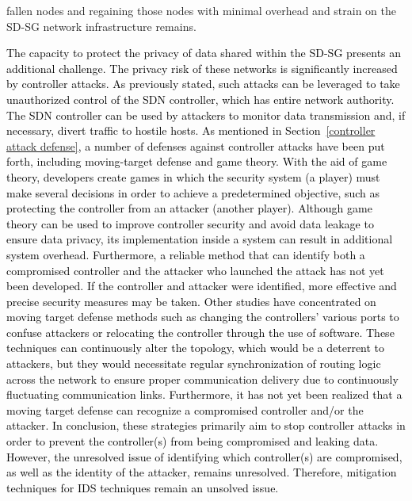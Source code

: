 \documentclass[conference]{IEEEtran}
\begin{document}
{fallen nodes and regaining those nodes with minimal overhead and strain on the SD-SG network infrastructure remains.}


\textcolor{black}{The capacity to protect the privacy of data shared within the SD-SG presents an additional challenge. The privacy risk of these networks is significantly increased by controller attacks. As previously stated, such attacks can be leveraged to take unauthorized control of the SDN controller, which has entire network authority. The SDN controller can be used by attackers to monitor data transmission and, if necessary, divert traffic to hostile hosts.  As mentioned in Section~\ref{controller attack defense}, a number of defenses against controller attacks have been put forth, including moving-target defense and game theory. With the aid of game theory, developers create games in which the security system (a player) must make several decisions in order to achieve a predetermined objective, such as protecting the controller from an attacker (another player). Although game theory can be used to improve controller security and avoid data leakage to ensure data privacy, its implementation inside a system can result in additional system overhead.  Furthermore, a reliable method that can identify both a compromised controller and the attacker who launched the attack has not yet been developed. If the controller and attacker were identified, more effective and precise security measures may be taken. Other studies have concentrated on moving target defense methods such as changing the controllers' various ports to confuse attackers or relocating the controller through the use of software. These techniques can continuously alter the topology, which would be a deterrent to attackers, but they would necessitate regular synchronization of routing logic across the network to ensure proper communication delivery due to continuously fluctuating communication links. Furthermore, it has not yet been realized that a moving target defense can recognize a compromised controller and/or the attacker. In conclusion, these strategies primarily aim to stop controller attacks in order to prevent the controller(s) from being compromised and leaking data. However, the unresolved issue of identifying which controller(s) are compromised, as well as the identity of the attacker, remains unresolved. Therefore, mitigation techniques for IDS techniques remain an unsolved issue.}
\end{document}
